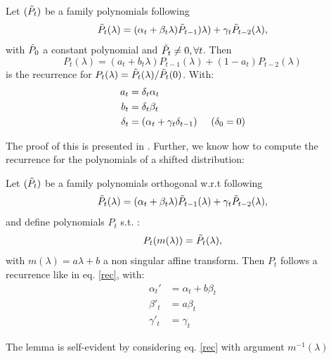 \documentclass{article}
\begin{document}
\begin{lemma}
Let $(\Tilde{P}_t)$ be a family polynomials  following  
\begin{equation*}
    \Tilde{P}_t(\lambda)=(\alpha_t+\beta_t\lambda)\Tilde{P}_{t-1})\lambda)+\gamma_t\Tilde{P}_{t-2}(\lambda),
\end{equation*}
with $\Tilde{P}_0$ a constant polynomial and $\Tilde{P}_t\neq0, \forall t$. Then
\begin{equation}
    P_t(\lambda)=(a_t+b_t\lambda)P_{t-1}(\lambda)+(1-a_t)P_{t-2}(\lambda)
\end{equation} is the recurrence for $P_t(\lambda)=\Tilde{P}_t(\lambda)/\Tilde{P}_t(0)$. With:
\begin{align}
    a_t&=\delta_t\alpha_t \\
    b_t&=\delta_t\beta_t \\
    \delta_t&=(\alpha_t+\gamma_t\delta_{t-1}) \hspace{0.5 cm } (\delta_0=0)
\end{align}
\end{lemma}
The proof of this is presented in \cite{pedregosa2020acceleration}. Further, we know how to compute the recurrence for the polynomials of a shifted distribution:
\begin{lemma}

Let $(\Tilde{P}_t)$ be a family polynomials orthogonal w.r.t  following  
\begin{equation}    \label{rec}
    \Tilde{P}_t(\lambda)=(\alpha_t+\beta_t\lambda)\Tilde{P}_{t-1}(\lambda)+\gamma_t\Tilde{P}_{t-2}(\lambda) ,
\end{equation}
and define polynomials $P_t$ s.t. :
$$
P_t(m(\lambda))=\Tilde{P}_t(\lambda),
$$
with $m(\lambda)=a\lambda+b$ a non singular affine transform. Then $P_t$ follows a recurrence like in eq. \eqref{rec}, with:
\begin{align}
    \alpha_t'&=\alpha_t+b\beta_t \\
    \beta'_t&=a\beta_t\\
    \gamma'_t&=\gamma_t
\end{align}
\end{lemma}
The lemma is self-evident by considering eq. \eqref{rec} with argument $m^{-1}(\lambda)$
\end{document}
